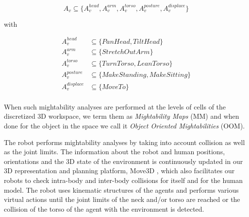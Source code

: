 \documentclass{svmult}
\begin{document}
\[ 
A_v \subseteq \{A_v^{head}, A_v^{arm}, A_v^{torso}, A_v^{posture}, A_v^{displace}\}
\]

with

\begin{align*}
A_v^{head} & \subseteq \{PanHead, TiltHead\} \\
A_v^{arm} & \subseteq \{StretchOutArm\} \\
A_v^{torso} & \subseteq \{TurnTorso, LeanTorso\} \\
A_v^{posture} & \subseteq \{MakeStanding, MakeSitting\} \\
A_v^{displace} & \subseteq \{MoveTo\} \\
\end{align*}

When such mightability analyses are performed at the levels of cells of the
discretized 3D workspace, we term them as \emph{Mightability Maps} (MM) and when done
for the object in the space we call it \emph{Object Oriented Mightabilities} (OOM).

The robot performs mightability analyses by taking into account collision
as well as the joint limits. The information about the robot and human
positions, orientations and the 3D state of the environment is continuously
updated in our 3D representation and planning platform, Move3D \cite{Simeon2001}, which
also facilitates our robots to check intra-body and inter-body collisions
for itself and for the human model. The robot uses kinematic structures of
the agents and performs various virtual actions until the joint limits
of the neck and/or torso are reached or the collision of the torso of
the agent with the environment is detected.
\end{document}

